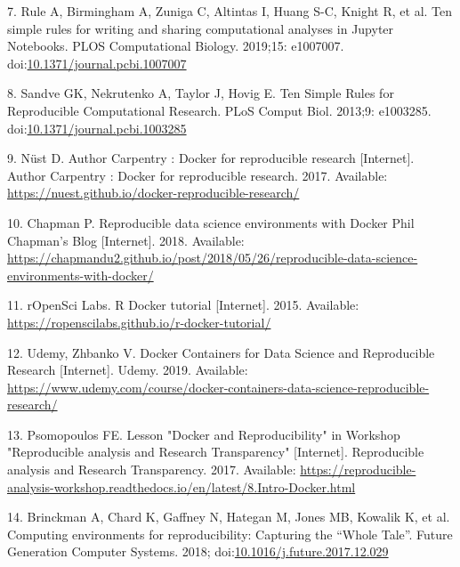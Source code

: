 \documentclass[10pt,letterpaper]{article}
\begin{document}
\leavevmode\hypertarget{ref-rule_ten_2019}{}%
7. Rule A, Birmingham A, Zuniga C, Altintas I, Huang S-C, Knight R, et
al. Ten simple rules for writing and sharing computational analyses in
Jupyter Notebooks. PLOS Computational Biology. 2019;15: e1007007.
doi:\href{https://doi.org/10.1371/journal.pcbi.1007007}{10.1371/journal.pcbi.1007007}

\leavevmode\hypertarget{ref-sandve_ten_2013}{}%
8. Sandve GK, Nekrutenko A, Taylor J, Hovig E. Ten Simple Rules for
Reproducible Computational Research. PLoS Comput Biol. 2013;9: e1003285.
doi:\href{https://doi.org/10.1371/journal.pcbi.1003285}{10.1371/journal.pcbi.1003285}

\leavevmode\hypertarget{ref-nust_author_2017}{}%
9. Nüst D. Author Carpentry : Docker for reproducible research
{[}Internet{]}. Author Carpentry : Docker for reproducible research.
2017. Available:
\url{https://nuest.github.io/docker-reproducible-research/}

\leavevmode\hypertarget{ref-chapman_reproducible_2018}{}%
10. Chapman P. Reproducible data science environments with Docker Phil
Chapman's Blog {[}Internet{]}. 2018. Available:
\url{https://chapmandu2.github.io/post/2018/05/26/reproducible-data-science-environments-with-docker/}

\leavevmode\hypertarget{ref-ropensci_labs_r_2015}{}%
11. rOpenSci Labs. R Docker tutorial {[}Internet{]}. 2015. Available:
\url{https://ropenscilabs.github.io/r-docker-tutorial/}

\leavevmode\hypertarget{ref-udemy_docker_2019}{}%
12. Udemy, Zhbanko V. Docker Containers for Data Science and
Reproducible Research {[}Internet{]}. Udemy. 2019. Available:
\url{https://www.udemy.com/course/docker-containers-data-science-reproducible-research/}

\leavevmode\hypertarget{ref-psomopoulos_lesson_2017}{}%
13. Psomopoulos FE. Lesson "Docker and Reproducibility" in Workshop
"Reproducible analysis and Research Transparency" {[}Internet{]}.
Reproducible analysis and Research Transparency. 2017. Available:
\url{https://reproducible-analysis-workshop.readthedocs.io/en/latest/8.Intro-Docker.html}

\leavevmode\hypertarget{ref-brinckman_computing_2018}{}%
14. Brinckman A, Chard K, Gaffney N, Hategan M, Jones MB, Kowalik K, et
al. Computing environments for reproducibility: Capturing the ``Whole
Tale''. Future Generation Computer Systems. 2018;
doi:\href{https://doi.org/10.1016/j.future.2017.12.029}{10.1016/j.future.2017.12.029}
\end{document}
